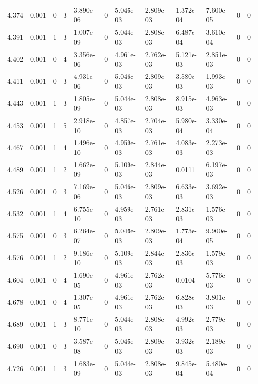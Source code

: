 \documentclass[preview]{standalone}
\begin{document}
{{{{{{\begin{tabular}{L{1.2cm}C{1.2cm} C{0.3cm}C{0.5cm} C{1.4cm}C{1.4cm} C{1.4cm}C{1.4cm} C{1.6cm}C{1.6cm} C{1.6cm}C{1.6cm}}
  4.374  &  0.001  & 0     &  3 &  3.890e-06  & 0  &  5.046e-03&   2.809e-03& 1.372e-04 & 7.600e-05   &  0 & 0  \\ 
  4.391  &  0.001  & 1     &  3 &  1.007e-09  & 0  &  5.044e-03&   2.808e-03& 6.487e-04 & 3.610e-04   &  0 & 0  \\ 
  4.402  &  0.001  & 0     &  4 &  3.356e-06  & 0  &  4.961e-03&   2.762e-03& 5.121e-03 & 2.851e-03   &  0 & 0  \\ 
  4.411  &  0.001  & 0     &  3 &  4.931e-06  & 0  &  5.046e-03&   2.809e-03& 3.580e-03 & 1.993e-03   &  0 & 0  \\ 
  4.443  &  0.001  & 1     &  3 &  1.805e-09  & 0  &  5.044e-03&   2.808e-03& 8.915e-03 & 4.963e-03   &  0 & 0  \\ 
  4.453  &  0.001  & 1     &  5 &  2.918e-10  & 0  &  4.857e-03&   2.704e-03& 5.980e-04 & 3.330e-04   &  0 & 0  \\ 
  4.467  &  0.001  & 1     &  4 &  1.496e-10  & 0  &  4.959e-03&   2.761e-03& 4.083e-03 & 2.273e-03   &  0 & 0  \\ 
  4.489  &  0.001  & 1     &  2 &  1.662e-09  & 0  &  5.109e-03&   2.844e-03& 0.0111 & 6.197e-03   &  0 & 0  \\ 
  4.526  &  0.001  & 0     &  3 &  7.169e-06  & 0  &  5.046e-03&   2.809e-03& 6.633e-03 & 3.692e-03   &  0 & 0  \\ 
  4.532  &  0.001  & 1     &  4 &  6.755e-10  & 0  &  4.959e-03&   2.761e-03& 2.831e-03 & 1.576e-03   &  0 & 0  \\ 
  4.575  &  0.001  & 0     &  3 &  6.264e-07  & 0  &  5.046e-03&   2.809e-03& 1.773e-04 & 9.900e-05   &  0 & 0  \\ 
  4.576  &  0.001  & 1     &  2 &  9.186e-10  & 0  &  5.109e-03&   2.844e-03& 2.836e-03 & 1.579e-03   &  0 & 0  \\ 
  4.604  &  0.001  & 0     &  4 &  1.690e-05  & 0  &  4.961e-03&   2.762e-03& 0.0104 & 5.776e-03   &  0 & 0  \\ 
  4.678  &  0.001  & 0     &  4 &  1.307e-05  & 0  &  4.961e-03&   2.762e-03& 6.828e-03 & 3.801e-03   &  0 & 0  \\ 
  4.689  &  0.001  & 1     &  3 &  8.771e-10  & 0  &  5.044e-03&   2.808e-03& 4.992e-03 & 2.779e-03   &  0 & 0  \\ 
  4.690  &  0.001  & 0     &  3 &  3.587e-08  & 0  &  5.046e-03&   2.809e-03& 3.932e-03 & 2.189e-03   &  0 & 0  \\ 
  4.726  &  0.001  & 1     &  3 &  1.683e-09  & 0  &  5.044e-03&   2.808e-03& 9.845e-04 & 5.480e-04   &  0 & 0  \\ 

\end{tabular}}}}}}}
\end{document}
